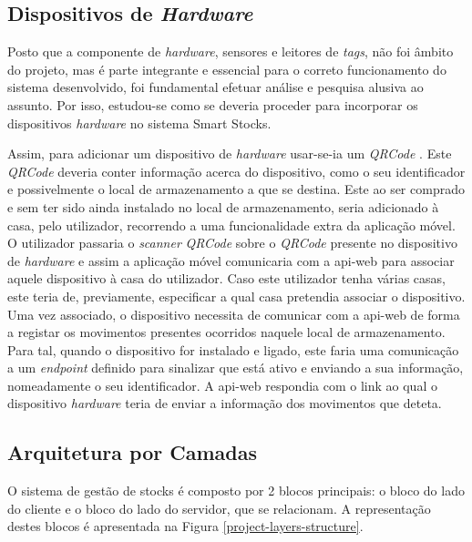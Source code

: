%
%


\subsection{Dispositivos de \textit{Hardware}}

Posto que a componente de \textit{hardware}, sensores e leitores de \textit{tags}, não foi âmbito do projeto, mas é parte integrante e essencial para o correto funcionamento do sistema desenvolvido, foi fundamental efetuar análise e pesquisa alusiva ao assunto. Por isso, estudou-se como se deveria proceder para incorporar os dispositivos \textit{hardware} no sistema Smart Stocks. 

Assim, para adicionar um dispositivo de \textit{hardware} usar-se-ia um \textit{QRCode} \cite{qrcode:about}. Este \textit{QRCode} deveria conter informação acerca do dispositivo, como o seu identificador e possivelmente o local de armazenamento a que se destina. Este ao ser comprado e sem ter sido ainda instalado no local de armazenamento, seria adicionado à casa, pelo utilizador, recorrendo a uma funcionalidade extra da aplicação móvel. O utilizador passaria o \textit{scanner} \textit{QRCode} sobre o \textit{QRCode} presente no dispositivo de \textit{hardware} e assim a aplicação móvel comunicaria com a \gls{api-web} para associar aquele dispositivo à casa do utilizador. Caso este utilizador tenha várias casas, este teria de, previamente, especificar a qual casa pretendia associar o dispositivo. Uma vez associado, o dispositivo necessita de comunicar com a \gls{api-web} de forma a registar os movimentos presentes ocorridos naquele local de armazenamento. Para tal, quando o dispositivo for instalado e ligado, este faria uma comunicação a um \textit{endpoint} definido para sinalizar que está ativo e enviando a sua informação, nomeadamente o seu identificador. A \gls{api-web} respondia com o link ao qual o dispositivo \textit{hardware} teria de enviar a informação dos movimentos que deteta.

%
%
\subsection{Arquitetura por Camadas}\label{subsec232}

O sistema de gestão de stocks é composto por 2 blocos principais: o bloco do lado do cliente e o bloco do lado do servidor, que se relacionam. A representação destes blocos é apresentada na Figura \ref{project-layers-structure}.

